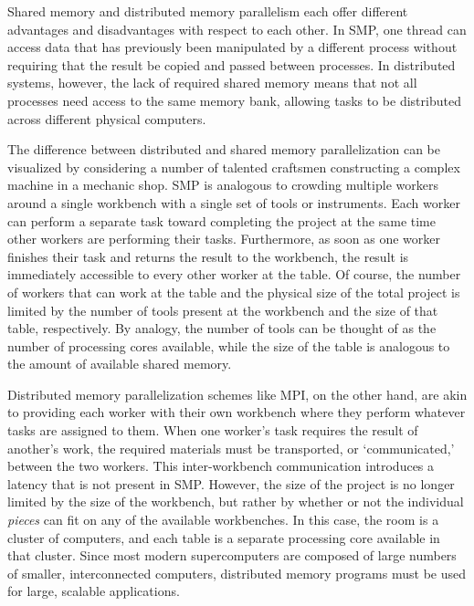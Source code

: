 Shared memory and distributed memory parallelism each offer different advantages
and disadvantages with respect to each other. In SMP, one thread can access data
that has previously been manipulated by a different process without requiring
that the result be copied and passed between processes. In distributed systems,
however, the lack of required shared memory means that not all processes need
access to the same memory bank, allowing tasks to be distributed across
different physical computers.

The difference between distributed and shared memory parallelization can be
visualized by considering a number of talented craftsmen constructing a complex
machine in a mechanic shop. SMP is analogous to crowding multiple workers around
a single workbench with a single set of tools or instruments. Each worker can
perform a separate task toward completing the project at the same time other
workers are performing their tasks. Furthermore, as soon as one worker finishes
their task and returns the result to the workbench, the result is immediately
accessible to every other worker at the table. Of course, the number of workers
that can work at the table and the physical size of the total project is limited
by the number of tools present at the workbench and the size of that table,
respectively. By analogy, the number of tools can be thought of as the number of
processing cores available, while the size of the table is analogous to the
amount of available shared memory.

Distributed memory parallelization schemes like MPI, on the other hand, are akin
to providing each worker with their own workbench where they perform whatever
tasks are assigned to them. When one worker's task requires the result of
another's work, the required materials must be transported, or `communicated,'
between the two workers. This inter-workbench communication introduces a latency
that is not present in SMP. However, the size of the project is no longer
limited by the size of the workbench, but rather by whether or not the
individual \emph{pieces} can fit on any of the available workbenches. In this
case, the room is a cluster of computers, and each table is a separate
processing core available in that cluster. Since most modern supercomputers are
composed of large numbers of smaller, interconnected computers, distributed
memory programs must be used for large, scalable applications.

